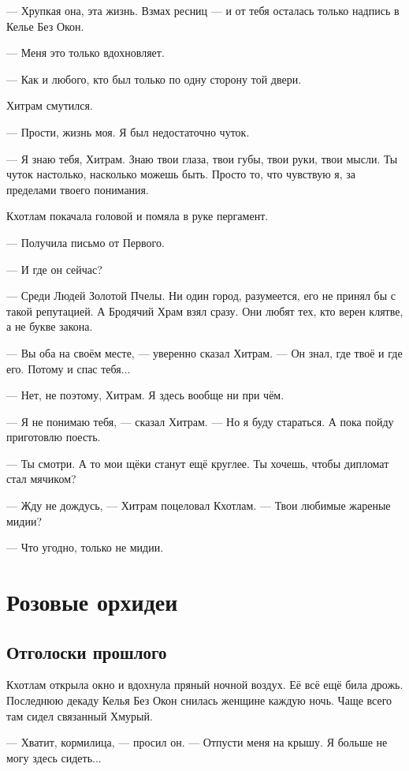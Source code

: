 \documentclass[a4paper,10pt,fleqn]{book}\usepackage{cooltooltips}\usepackage{polyglossia}\setdefaultlanguage{english}\setotherlanguage{russian}\defaultfontfeatures{Ligatures=TeX,Mapping=tex-text} \usepackage{xcolor}\definecolor{lightgray}{HTML}{bbbbbb}\color{lightgray}\newcommand{\ml}[3]{\textcolor{black}{#3}}
\begin{document}
--- Хрупкая она, эта жизнь.
Взмах ресниц --- и от тебя осталась только надпись в Келье Без Окон.

--- Меня это только вдохновляет.

--- Как и любого, кто был только по одну сторону той двери.

Хитрам смутился.

--- Прости, жизнь моя.
Я был недостаточно чуток.

--- Я знаю тебя, Хитрам.
Знаю твои глаза, твои губы, твои руки, твои мысли.
Ты чуток настолько, насколько можешь быть.
Просто то, что чувствую я, за пределами твоего понимания.

Кхотлам покачала головой и помяла в руке пергамент.

--- Получила письмо от Первого.

--- И где он сейчас?

--- Среди Людей Золотой Пчелы.
Ни один город, разумеется, его не принял бы с такой репутацией.
А Бродячий Храм взял сразу.
Они любят тех, кто верен клятве, а не букве закона.

--- Вы оба на своём месте, --- уверенно сказал Хитрам.
--- Он знал, где твоё и где его.
Потому и спас тебя...

--- Нет, не поэтому, Хитрам.
Я здесь вообще ни при чём.

--- Я не понимаю тебя, --- сказал Хитрам.
--- Но я буду стараться.
А пока пойду приготовлю поесть.

--- Ты смотри.
А то мои щёки станут ещё круглее.
Ты хочешь, чтобы дипломат стал мячиком?

--- Жду не дождусь, --- Хитрам поцеловал Кхотлам.
--- Твои любимые жареные мидии?

--- Что угодно, только не мидии.

\chapter{Розовые орхидеи}

\section{Отголоски прошлого}

Кхотлам открыла окно и вдохнула пряный ночной воздух.
Её всё ещё била дрожь.
Последнюю декаду Келья Без Окон снилась женщине каждую ночь.
Чаще всего там сидел связанный Хмурый.

--- Хватит, кормилица, --- просил он.
--- Отпусти меня на крышу.
Я больше не могу здесь сидеть...
\end{document}
